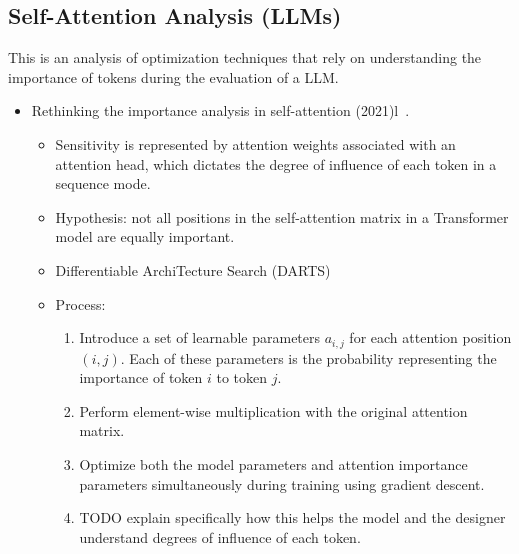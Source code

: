 
\subsection{Self-Attention Analysis (LLMs)}\label{subsec:token-importance-analysis}

This is an analysis of optimization techniques that rely on understanding the importance of tokens during the evaluation of a LLM\@.

\begin{itemize}
    \item Rethinking the importance analysis in self-attention (2021)l~\cite{shi2021sparsebert}.
    \begin{itemize}
        \item Sensitivity is represented by attention weights associated with an attention head, which dictates the degree of influence of each token in a sequence mode.
        \item Hypothesis: not all positions in the self-attention matrix in a Transformer model are equally important.
        \item Differentiable ArchiTecture Search (DARTS)
        \item Process:
        \begin{enumerate}
            \item Introduce a set of learnable parameters $a_{i,j}$ for each attention position $(i, j)$.
            Each of these parameters is the probability representing the importance of token $i$ to token $j$.
            \item Perform element-wise multiplication with the original attention matrix.
            \item Optimize both the model parameters and attention importance parameters simultaneously during training using gradient descent.
            \item TODO explain specifically how this helps the model and the designer understand degrees of influence of each token.
        \end{enumerate}
    \end{itemize}
\end{itemize}